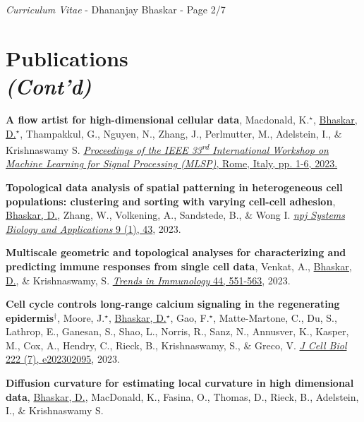 \documentclass[margin,line]{res}
\begin{document}
\begin{resume}
\newpage
\begin{flushright}
\textit{Curriculum Vitae} - Dhananjay Bhaskar - Page 2/7
\end{flushright}
\vspace*{.15cm}

\section{\sc Publications\\\textit{(Cont'd)}}
{
\renewcommand\leftmargini{0em}
\begin{etaremune}[start=16]
\item{\bf A flow artist for high-dimensional cellular data},
Macdonald, K.$^\star$, \underline{Bhaskar, D.}$^\star$, Thampakkul, G., Nguyen, N., Zhang, J., Perlmutter, M., Adelstein, I., \& Krishnaswamy S.
\href{https://doi.org/10.1109/MLSP55844.2023.10285942}{\textit{Proceedings of the IEEE 33\textsuperscript{rd} International Workshop on Machine Learning for Signal Processing (MLSP)}, Rome, Italy, pp. 1-6, 2023.}
\item{\bf Topological data analysis of spatial patterning in heterogeneous cell populations: clustering and sorting with varying cell-cell adhesion},
\underline{Bhaskar, D.}, Zhang, W., Volkening, A., Sandstede, B., \& Wong I.
\href{https://www.nature.com/articles/s41540-023-00302-8}{\textit{npj Systems Biology and Applications} 9 (1), 43}, 2023.
\vspace*{.1cm}
\item{\bf Multiscale geometric and topological analyses for characterizing and predicting immune responses from single cell data},
Venkat, A., \underline{Bhaskar, D.}, \& Krishnaswamy, S.
\href{https://doi.org/10.1016/j.it.2023.05.003}{\textit{Trends in Immunology} 44, 551-563}, 2023.
\vspace*{.1cm}
\item{\bf Cell cycle controls long-range calcium signaling in the regenerating epidermis$^\dagger$}, 
Moore, J.$^\star$, \underline{Bhaskar, D.}$^\star$, Gao, F.$^\star$, Matte-Martone, C., Du, S., Lathrop, E., Ganesan, S., Shao, L., Norris, R., Sanz, N., Annusver, K., Kasper, M., Cox, A., Hendry, C., Rieck, B., Krishnaswamy, S., \& Greco, V.
\href{https://doi.org/10.1083/jcb.202302095}{\textit{J Cell Biol} 222 (7), e202302095}, 2023.
\vspace*{.1cm}
\item{\bf Diffusion curvature for estimating local curvature in high dimensional data},
\underline{Bhaskar, D.}, MacDonald, K., Fasina, O., Thomas, D., Rieck, B., Adelstein, I., \& Krishnaswamy S.

\end{etaremune}}
\end{resume}
\end{document}
